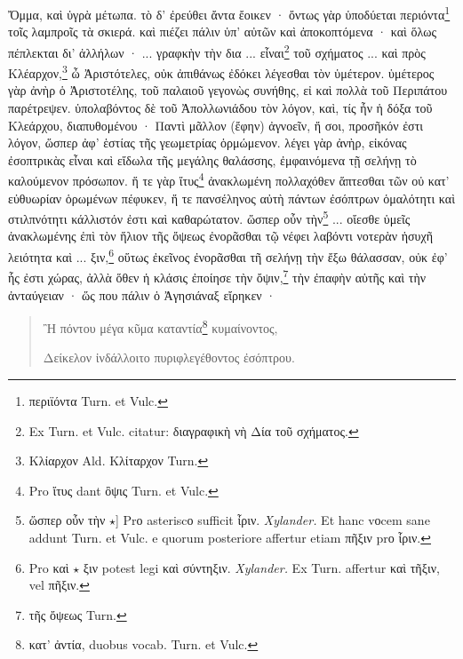 \documentclass[a4paper, 11pt, oneside, polutonikogreek, german]{article}
\begin{document}
Ὄμμα, καὶ ὑγρὰ μέτωπα. τὸ δ' ἐρεύθει ἄντα ἔοικεν · ὄντως γὰρ ὑποδύεται περιόντα\footnote{περιϊόντα Turn. et Vulc.} τοῖς λαμπροῖς τὰ σκιερά. καὶ πιέζει πάλιν ὑπ' αὐτῶν καὶ ἀποκοπτόμενα · καὶ ὅλως πέπλεκται δι' ἀλλήλων · ... γραφκὴν τὴν δια ... εἶναι\footnote{Ex Turn. et Vulc. citatur: διαγραφικὴ νὴ Δία τοῦ σχήματος.} τοῦ σχήματος ... καὶ πρὸς Κλέαρχον,\footnote{Κλίαρχον Ald. Κλίταρχον Turn.} ὦ Ἀριστότελες, οὐκ ἀπιθάνως ἐδόκει λέγεσθαι τὸν ὑμέτερον. ὑμέτερος γὰρ ἀνὴρ ὁ Ἀριστοτέλης, τοῦ παλαιοῦ γεγονὼς συνήθης, εἰ καὶ πολλὰ τοῦ Περιπάτου παρέτρεψεν. ὑπολαβόντος δὲ τοῦ Ἀπολλωνιάδου τὸν λόγον, καὶ, τίς ἦν ἡ δόξα τοῦ Κλεάρχου, διαπυθομένου · Παντὶ μᾶλλον (ἔφην) ἀγνοεῖν, ἤ σοι, προσῆκόν ἐστι λόγον, ὥσπερ ἀφ' ἑστίας τῆς γεωμετρίας ὁρμώμενον. λέγει γὰρ ἀνὴρ, εἰκόνας ἐσοπτρικὰς εἶναι καὶ εἴδωλα τῆς μεγάλης θαλάσσης, ἐμφαινόμενα τῇ σελήνῃ τὸ καλούμενον πρόσωπον. ἥ τε γὰρ ἴτυς\footnote{Pro ἴτυς dant ὂψις Turn. et Vulc.} ἀνακλωμένη πολλαχόθεν ἅπτεσθαι τῶν οὐ κατ' εὐθυωρίαν ὁρωμένων πέφυκεν, ἥ τε πανσέληνος αὐτὴ πάντων ἐσόπτρων ὁμαλότητι καὶ στιλπνότητι κάλλιστόν ἐστι καὶ καθαρώτατον. ὥσπερ οὖν τὴν\footnote{ὥσπερ οὖν τὴν $\star$] Prο asteriscο sufficit ἶριν. \emph{Xylander.} Et hanc vοcem sane addunt Turn. et Vulc. e quorum posteriore affertur etiam πῆξιν prο ἶριν.} ... οἴεσθε ὑμεῖς ἀνακλωμένης ἐπὶ τὸν ἥλιον τῆς ὄψεως ἐνορᾶσθαι τῷ νέφει λαβόντι νοτερὰν ἡσυχῆ λειότητα καὶ ... ξιν,\footnote{Pro καὶ $\star$ ξιν potest legi καὶ σύντηξιν. \emph{Xylander.} Ex Turn. affertur καὶ τῆξιν, vel πῆξιν.} οὕτως ἐκεῖνος ἐνορᾶσθαι τῆ σελήνῃ τὴν ἔξω θάλασσαν, οὐκ ἐφ' ἧς ἐστι χώρας, ἀλλὰ ὅθεν ἡ κλάσις ἐποίησε τὴν ὄψιν,\footnote{τῆς ὄψεως Turn.} τὴν ἐπαφὴν αὑτῆς καὶ τὴν ἀνταύγειαν · ὥς που πάλιν ὁ Ἀγησιάναξ εἴρηκεν ·
\begin{quotation}
Ἢ πόντου μέγα κῦμα καταντία\footnote{κατ' ἀντία, duobus vocab. Turn. et Vulc.} κυμαίνοντος,

Δείκελον ἰνδάλλοιτο πυριφλεγέθοντος ἐσόπτρου.
\end{quotation}
\end{document}

